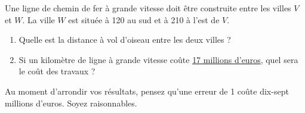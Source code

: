 
\begin{exercice}\label{exosmath-0293}

    Une ligne de chemin de fer à grande vitesse doit être construite entre les villes \( V\) et \( W\). La ville \( W\) est située à \unit{120}{\kilo\meter} au sud et à \unit{210}{\kilo\meter} à l'est de \( V\).
    \begin{enumerate}
        \item
            Quelle est la distance à vol d'oiseau entre les deux villes ?
        \item
            Si un kilomètre de ligne à grande vitesse coûte \href{http://fr.wikipedia.org/wiki/Lgv}{17 millions d'euros}, quel sera le coût des travaux ?
    \end{enumerate}
    Au moment d'arrondir vos résultats, pensez qu'une erreur de \unit{1}{\kilo\meter} coûte dix-sept millions d'euros. Soyez raisonnables.

\end{exercice} 
